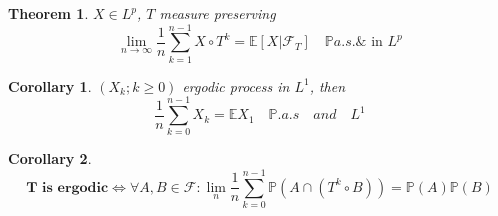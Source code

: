 \documentclass[a4paper,11pt]{book}
\newtheorem{theorem}{Theorem}[section]
\newtheorem{corollary}{Corollary}[theorem]
\theoremstyle{definition}
\theoremstyle{remark}
\begin{document}
\begin{theorem}
$X \in L^p$, $T$ measure preserving
	\begin{equation*}
	\lim_{n \rightarrow \infty} \frac{1}{n} \sum_{k = 1}^{n-1} X \circ T^k = \mathbb{E}[X|\mathcal{F}_T] \quad \mathbb{P}a.s. \& \text{ in $L^p$}
\end{equation*}
\end{theorem}

\begin{corollary}
	$(X_k; k \geq 0)$ ergodic process in $L^1$, then 
	\begin{equation*}
		\frac{1}{n} \sum_{k = 0}^{n-1} X_k = \mathbb{E}X_1 \quad \mathbb{P}.a.s \quad and \quad L^1
	\end{equation*}
\end{corollary}

\begin{corollary}
	\begin{equation*}
		\textbf{T is ergodic} \Leftrightarrow \forall A, B \in \mathcal{F}: \lim_n \frac{1}{n} \sum_{k = 0}^{n-1} \mathbb{P}(A \cap (T^k \circ B)) = \mathbb{P}(A)\mathbb{P}(B)
	\end{equation*}
\end{corollary}







\newpage
\end{document}
